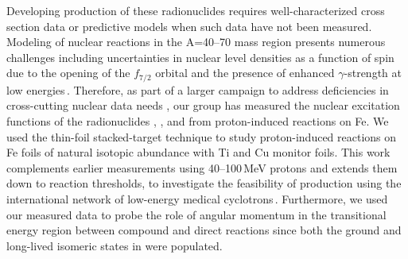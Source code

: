 Developing production of these radionuclides requires well-characterized cross section data or predictive models when such data have not been measured.   
Modeling of nuclear reactions in 
the A=40--70 mass region presents numerous challenges including uncertainties in nuclear level densities as a function of spin due to the opening of the $f_{7/2}$ orbital and the presence of enhanced $\gamma$-strength at low energies\,\cite{Voinov2004a,Algin2008,Algin2007}.  
Therefore, as part of a larger campaign to address deficiencies in cross-cutting nuclear data needs \cite{Bernstein2019a}, our group has
measured the   nuclear excitation functions of the radionuclides ,   , and  from proton-induced reactions on Fe.
We used the thin-foil stacked-target technique to study proton-induced reactions on 
Fe foils of natural isotopic abundance with 
Ti and 
Cu monitor foils.
This work 
complements 
earlier measurements using 40--100\,MeV protons  and extends them down to reaction thresholds,  to investigate the feasibility of production using the international network   of low-energy medical cyclotrons\,\cite{Graves2016}. 
Furthermore, 
we used our measured data to probe the role of angular momentum in the transitional energy region between compound and direct reactions since both the ground and long-lived isomeric states in  were populated.  









